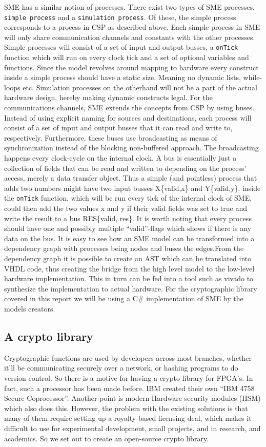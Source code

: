\documentclass[a4paper]{article}
\begin{document}
SME has a similar notion of processes. There exist two types of SME processes, \texttt{simple process} and a \texttt{simulation process}. Of these, the simple process corresponds to a process in CSP as described above. Each simple process in SME will only share communication channels and constants with the other processes. Simple processes will consist of a set of input and output busses, a \texttt{onTick} function which will run on every clock tick and a set of optional variables and functions. Since the model revolves around mapping to hardware every construct inside a simple process should have a static size. Meaning no dynamic lists, while-loops etc. Simulation processes on the otherhand will not be a part of the actual hardware design, hereby making dynamic constructs legal.
For the communications channels, SME extends the concepts from CSP by using buses. Instead of using explicit naming for sources and destinations, each process will consist of a set of input and output busses that it can read and write to, respectively. Furthermore, these buses use broadcasting as means of synchronization instead of the blocking non-buffered approach.  The broadcasting happens every clock-cycle on the internal clock.
A bus is essentially just a collection of fields that can be read and written to depending on the process' access, merely a data transfer object. Thus a simple (and pointless) process that adds two numbers might have two input busses X\{valid,x\} and Y\{valid,y\}. inside the \texttt{onTick} function, which will be run every tick of the internal clock of SME, could then add the two values x and y if their valid fields was set to true and write the result to a bus RES\{valid, res\}. It is worth noting that every process should have one and possibly multiple ``valid''-flags which shows if there is any data on the bus. It is easy to see how an SME model can be transformed into a dependency graph with processes being nodes and buses the edges.From the dependency graph it is possible to create an AST which can be translated into VHDL code\cite{SME}, thus creating the bridge from the high level model to the low-level hardware implementation. This in turn can be fed into a tool such as vivado\cite{} to synthesize the implementation to actual hardware. For the cryptographic library covered in this report we will be using a C\# implementation of SME by the models creators\cite{SME}.
\subsection{A crypto library}
\label{sec:org8829114}
Cryptographic functions are used by developers across most branches, whether it'll be communicating securely over a network, or hashing programs to do version control.
So there is a motive for having a crypto library for FPGA's. In fact, such a processor has been made before. IBM created their own ``IBM 4758 Secure Coprocessor''\cite{IBM4758}. Another point is modern Hardware security modules (HSM) which also does this.
However, the problem with the existing solutions is that many of them require setting up a royalty-based licensing deal, which makes it difficult to use for experimental development, small projects, and in research, and academics.
So we set out to create an open-source crypto library.
\end{document}
